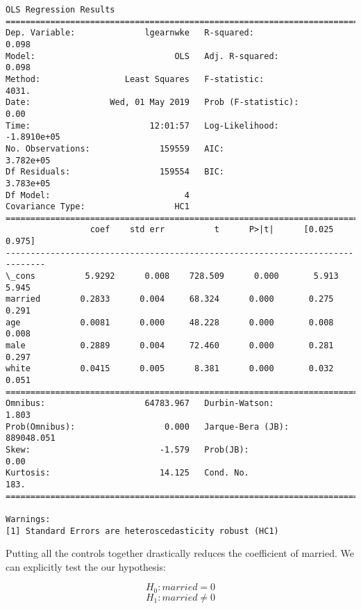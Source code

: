 \documentclass[11pt]{article}
\begin{document}
    \begin{Verbatim}[commandchars=\\\{\}]
                            OLS Regression Results                            
==============================================================================
Dep. Variable:              lgearnwke   R-squared:                       0.098
Model:                            OLS   Adj. R-squared:                  0.098
Method:                 Least Squares   F-statistic:                     4031.
Date:                Wed, 01 May 2019   Prob (F-statistic):               0.00
Time:                        12:01:57   Log-Likelihood:            -1.8910e+05
No. Observations:              159559   AIC:                         3.782e+05
Df Residuals:                  159554   BIC:                         3.783e+05
Df Model:                           4                                         
Covariance Type:                  HC1                                         
==============================================================================
                 coef    std err          t      P>|t|      [0.025      0.975]
------------------------------------------------------------------------------
\_cons          5.9292      0.008    728.509      0.000       5.913       5.945
married        0.2833      0.004     68.324      0.000       0.275       0.291
age            0.0081      0.000     48.228      0.000       0.008       0.008
male           0.2889      0.004     72.460      0.000       0.281       0.297
white          0.0415      0.005      8.381      0.000       0.032       0.051
==============================================================================
Omnibus:                    64783.967   Durbin-Watson:                   1.803
Prob(Omnibus):                  0.000   Jarque-Bera (JB):           889048.051
Skew:                          -1.579   Prob(JB):                         0.00
Kurtosis:                      14.125   Cond. No.                         183.
==============================================================================

Warnings:
[1] Standard Errors are heteroscedasticity robust (HC1)

    \end{Verbatim}

    Putting all the controls together drastically reduces the coefficient of
married. We can explicitly test the our hypothesis:

\[ H_0 : married = 0 \] \[ H_1 : married \neq 0 \]
\end{document}
